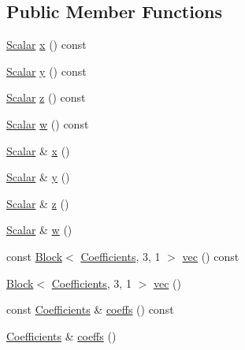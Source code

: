 \subsection*{Public Member Functions}
\begin{DoxyCompactItemize}
\item 
\hyperlink{class_rotation_base_ae9cbe0a3a87dfe2fa70958d9fe948a09}{Scalar} \hyperlink{class_quaternion_a675b3ee05d5fe850ff918768953c872b}{x} () const 
\item 
\hyperlink{class_rotation_base_ae9cbe0a3a87dfe2fa70958d9fe948a09}{Scalar} \hyperlink{class_quaternion_acbbd96430e27ad789764e1f6fe0e34ef}{y} () const 
\item 
\hyperlink{class_rotation_base_ae9cbe0a3a87dfe2fa70958d9fe948a09}{Scalar} \hyperlink{class_quaternion_ae95ae113469a730c7ed21f0812cf3c89}{z} () const 
\item 
\hyperlink{class_rotation_base_ae9cbe0a3a87dfe2fa70958d9fe948a09}{Scalar} \hyperlink{class_quaternion_a9d7444ce18bda3bb08e6845ba060e6d8}{w} () const 
\item 
\hyperlink{class_rotation_base_ae9cbe0a3a87dfe2fa70958d9fe948a09}{Scalar} \& \hyperlink{class_quaternion_a22cbbb9e3e27c1b1439c1c7bb1dac5d1}{x} ()
\item 
\hyperlink{class_rotation_base_ae9cbe0a3a87dfe2fa70958d9fe948a09}{Scalar} \& \hyperlink{class_quaternion_a4d100a6be90231e0490ed266b4940dba}{y} ()
\item 
\hyperlink{class_rotation_base_ae9cbe0a3a87dfe2fa70958d9fe948a09}{Scalar} \& \hyperlink{class_quaternion_a6346563343b59f2409eebfb1115a28aa}{z} ()
\item 
\hyperlink{class_rotation_base_ae9cbe0a3a87dfe2fa70958d9fe948a09}{Scalar} \& \hyperlink{class_quaternion_a13d09bc70ce4af13179ed5259c965305}{w} ()
\item 
const \hyperlink{class_block}{Block}$<$ \hyperlink{class_quaternion_ad622be107fa0707a98a1966345f961a1}{Coefficients}, 3, 1 $>$ \hyperlink{class_quaternion_a10d14d80ff427795e62e7e8b049f1279}{vec} () const 
\item 
\hyperlink{class_block}{Block}$<$ \hyperlink{class_quaternion_ad622be107fa0707a98a1966345f961a1}{Coefficients}, 3, 1 $>$ \hyperlink{class_quaternion_a4309780e1a89a4fcec76a2484d003557}{vec} ()
\item 
const \hyperlink{class_quaternion_ad622be107fa0707a98a1966345f961a1}{Coefficients} \& \hyperlink{class_quaternion_a90e1d4dccf2cbea8458ac5de36482fea}{coeffs} () const 
\item 
\hyperlink{class_quaternion_ad622be107fa0707a98a1966345f961a1}{Coefficients} \& \hyperlink{class_quaternion_a455e9ef89e552d2c50e4350428e91450}{coeffs} ()

\end{DoxyCompactItemize}
